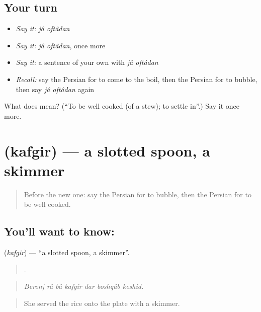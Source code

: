 \subsection*{Your turn}
\begin{itemize}
\raggedright
  \item \emph{Say it:} \emph{jâ oftâdan}
  \item \emph{Say it:} \emph{jâ oftâdan}, once more
  \item \emph{Say it:} a sentence of your own with \emph{jâ oftâdan}
  \item \emph{Recall:} say the Persian for to come to the boil, then the Persian for to bubble, then say \emph{jâ oftâdan} again
\end{itemize}

\begin{tcolorbox}[breakable,colback=teal!4,colframe=teal!35!black,title={Before you move on}]
What does   mean? (\textquotedblleft{}To be well cooked (of a stew); to settle in\textquotedblright{}.) Say it once more.
\end{tcolorbox}
\section[\texorpdfstring{\fa{کفگیر} (kafgir)}{کفگیر (kafgir)}]{ (kafgir) — a slotted spoon, a skimmer}

\label{lesson:FA-C358-kafgir}



\begin{quote}
Before the new one: say the Persian for to bubble, then the Persian for to be well cooked.
\end{quote}

\subsection*{You'll want to know: }
\textbf{} (\emph{kafgir}) — \textquotedblleft{}a slotted spoon, a skimmer\textquotedblright{}.

\begin{quote}
      .
\end{quote}

\begin{quote}
\emph{Berenj râ bâ kafgir dar boshqâb keshid.}
\end{quote}

\begin{quote}
She served the rice onto the plate with a skimmer.
\end{quote}

